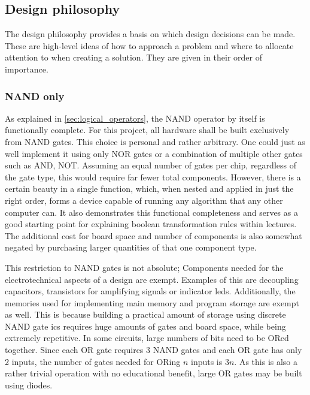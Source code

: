 \subsection{Design philosophy} \label{sec:design_philosophy}

The design philosophy provides a basis on which design decisions can be made. These are high-level ideas of how to approach a problem and where to allocate attention to when creating a solution. They are given in their order of importance.

\subsubsection{NAND only}

As explained in \autoref{sec:logical_operators}, the NAND operator by itself is functionally complete. For this project, all hardware shall be built exclusively from NAND gates. This choice is personal and rather arbitrary. One could just as well implement it using only NOR gates or a combination of multiple other gates such as AND, NOT. Assuming an equal number of gates per chip, regardless of the gate type, this would require far fewer total components. However, there is a certain beauty in a single function, which, when nested and applied in just the right order, forms a device capable of running any algorithm that any other computer can. It also demonstrates this functional completeness and serves as a good starting point for explaining boolean transformation rules within lectures. The additional cost for board space and number of components is also somewhat negated by purchasing larger quantities of that one component type.

This restriction to NAND gates is not absolute; Components needed for the electrotechnical aspects of a design are exempt. Examples of this are decoupling capacitors, transistors for amplifying signals or indicator \acp{led}. Additionally, the memories used for implementing main memory and program storage are exempt as well. This is because building a practical amount of storage using discrete NAND gate \acp{ic} requires huge amounts of gates and board space, while being extremely repetitive. In some circuits, large numbers of bits need to be ORed together. Since each OR gate requires 3 NAND gates and each OR gate has only 2 inputs, the number of gates needed for ORing $n$ inputs is $3n$. As this is also a rather trivial operation with no educational benefit, large OR gates may be built using diodes.

